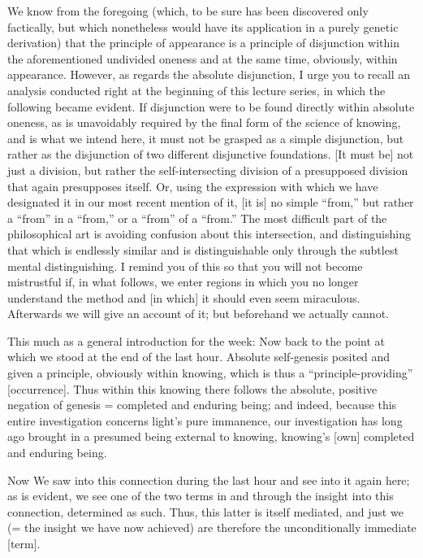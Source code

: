We know from the foregoing
(which, to be sure has been discovered only factically,
but which nonetheless would have its application
in a purely genetic derivation)
that the principle of appearance is
a principle of disjunction
within the aforementioned undivided oneness
and at the same time, obviously, within appearance.
However, as regards the absolute disjunction,
I urge you to recall an analysis conducted right at
the beginning of this lecture series,
in which the following became evident.
If disjunction were to be found
directly within absolute oneness,
as is unavoidably required by
the final form of the science of knowing,
and is what we intend here,
it must not be grasped as a simple disjunction,
but rather as the disjunction of
two different disjunctive foundations.
[It must be] not just a division,
but rather the self-intersecting division
of a presupposed division that again presupposes itself.
Or, using the expression with which we have designated it
in our most recent mention of it,
[it is] no simple “from,”
but rather a “from” in a “from,”
or a “from” of a “from.”
The most difficult part of the philosophical art is
avoiding confusion about this intersection,
and distinguishing that which is endlessly similar
and is distinguishable only through
the subtlest mental distinguishing.
I remind you of this so that you will not become mistrustful
if, in what follows, we enter regions
in which you no longer understand the method
and [in which] it should even seem miraculous.
Afterwards we will give an account of it;
but beforehand we actually cannot.

This much as a general introduction for the week:
Now back to the point at which we stood at the end of the last hour.
Absolute self-genesis posited and given a principle,
obviously within knowing,
which is thus a “principle-providing” [occurrence].
Thus within this knowing there follows
the absolute, positive negation of genesis =
completed and enduring being;
and indeed, because this entire investigation
concerns light's pure immanence,
our investigation has long ago brought in
a presumed being external to knowing,
knowing's [own] completed and enduring being.

Now We saw into this connection during the last hour
and see into it again here;
as is evident, we see one of the two terms
in and through the insight into this connection,
determined as such.
Thus, this latter is itself mediated,
and just we (= the insight we have now achieved) are
therefore the unconditionally immediate [term].

